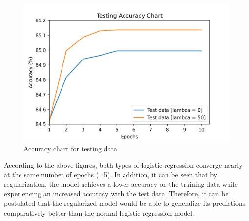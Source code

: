 \documentclass[12pt,a4paper]{article}
\begin{document}
	\vspace{-0.6cm}
	\begin{figure}[H]
		\centering
		\includegraphics[scale=.63]{Figures/Acc_test}
		\caption{Accuracy chart for testing data}
	\end{figure}
	
	\vspace{-0.4cm}
	\noindent According to the above figures, both types of logistic regression converge nearly at the same number of epochs (=5). In addition, it can be seen that by regularization, the model achieves a lower accuracy on the training data while experiencing an increased accuracy with the test data. Therefore, it can be postulated that the regularized model would be able to generalize its predictions comparatively better than the normal logistic regression model. 
	
\end{document}
